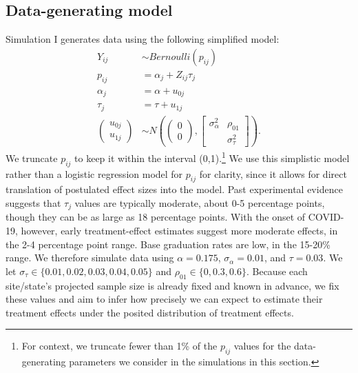 \documentclass[]{article}
\begin{document}
\subsection{Data-generating model}

Simulation I generates data using the following simplified model:
\begin{align*}
    Y_{ij} &\sim Bernoulli(p_{ij}) \\
    p_{ij} &= \alpha_j + Z_{ij} \tau_j \\
    \alpha_j &= \alpha + u_{0j} \\
	\tau_j &= \tau + u_{1j} \\
	\begin{pmatrix}
		u_{0j} \\ u_{1j}
	\end{pmatrix} &\sim N\left(
	\begin{pmatrix}
		0 \\ 0
	\end{pmatrix}, 
	\begin{bmatrix}
		\sigma^2_\alpha & \rho_{01} \\  & \sigma^2_\tau
	\end{bmatrix}\right).
\end{align*}
We truncate $p_{ij}$ to keep it within the interval (0,1).\footnote{For context, we truncate fewer than 1\% of the $p_{ij}$ values for the data-generating parameters we consider in the simulations in this section.}
We use this simplistic model rather than a logistic regression model for $p_{ij}$ for clarity, since it allows for direct translation of postulated effect sizes into the model.
Past experimental evidence suggests that $\tau_j$ values are typically moderate, about 0-5 percentage points, though they can be as large as 18 percentage points.
With the onset of COVID-19, however, early treatment-effect estimates suggest more moderate effects, in the 2-4 percentage point range.
Base graduation rates are low, in the 15-20\% range.
We therefore simulate data using $\alpha = 0.175$, $\sigma_\alpha=0.01$, and $\tau=0.03$.
We let $\sigma_\tau \in \{0.01, 0.02, 0.03, 0.04, 0.05\}$ and $\rho_{01} \in \{0, 0.3, 0.6\}$.
Because each site/state's projected sample size is already fixed and known in advance, we fix these values and aim to infer how precisely we can expect to estimate their treatment effects under the posited distribution of treatment effects.
\end{document}
